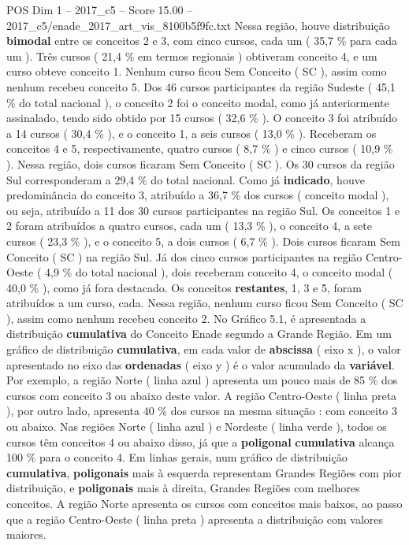 \begin{textsample}{POS Dim 1 – 2017\_c5 – Score 15.00 – 2017\_c5/enade\_2017\_art\_vis\_8100b5f9fc.txt}
Nessa região, houve distribuição \textbf{bimodal} entre os conceitos 2 e 3, com cinco cursos, cada um ( 35,7 \% para cada um ).
Três cursos ( 21,4 \% em termos regionais ) obtiveram conceito 4, e um curso obteve conceito 1.
Nenhum curso ficou Sem Conceito ( SC ), assim como nenhum recebeu conceito 5.
Dos 46 cursos participantes da região Sudeste ( 45,1 \% do total nacional ), o conceito 2 foi o conceito modal, como já anteriormente assinalado, tendo sido obtido por 15 cursos ( 32,6 \% ).
O conceito 3 foi atribuído a 14 cursos ( 30,4 \% ), e o conceito 1, a seis cursos ( 13,0 \% ).
Receberam os conceitos 4 e 5, respectivamente, quatro cursos ( 8,7 \% ) e cinco cursos ( 10,9 \% ).
Nessa região, dois cursos ficaram Sem Conceito ( SC ).
Os 30 cursos da região Sul corresponderam a 29,4 \% do total nacional.
Como já \textbf{indicado}, houve predominância do conceito 3, atribuído a 36,7 \% dos cursos ( conceito modal ), ou seja, atribuído a 11 dos 30 cursos participantes na região Sul.
Os conceitos 1 e 2 foram atribuídos a quatro cursos, cada um ( 13,3 \% ), o conceito 4, a sete cursos ( 23,3 \% ), e o conceito 5, a dois cursos ( 6,7 \% ).
Dois cursos ficaram Sem Conceito ( SC ) na região Sul.
Já dos cinco cursos participantes na região Centro-Oeste ( 4,9 \% do total nacional ), dois receberam conceito 4, o conceito modal ( 40,0 \% ), como já fora destacado.
Os conceitos \textbf{restantes}, 1, 3 e 5, foram atribuídos a um curso, cada.
Nessa região, nenhum curso ficou Sem Conceito ( SC ), assim como nenhum recebeu conceito 2.
No Gráfico 5.1, é apresentada a distribuição \textbf{cumulativa} do Conceito Enade segundo a Grande Região.
Em um gráfico de distribuição \textbf{cumulativa}, em cada valor de \textbf{abscissa} ( eixo x ), o valor apresentado no eixo das \textbf{ordenadas} ( eixo y ) é o valor acumulado da \textbf{variável}.
Por exemplo, a região Norte ( linha azul ) apresenta um pouco mais de 85 \% dos cursos com conceito 3 ou abaixo deste valor.
A região Centro-Oeste ( linha preta ), por outro lado, apresenta 40 \% dos cursos na mesma situação : com conceito 3 ou abaixo.
Nas regiões Norte ( linha azul ) e Nordeste ( linha verde ), todos os cursos têm conceitos 4 ou abaixo disso, já que a \textbf{poligonal} \textbf{cumulativa} alcança 100 \% para o conceito 4.
Em linhas gerais, num gráfico de distribuição \textbf{cumulativa}, \textbf{poligonais} mais à esquerda representam Grandes Regiões com pior distribuição, e \textbf{poligonais} mais à direita, Grandes Regiões com melhores conceitos.
A região Norte apresenta os cursos com conceitos mais baixos, ao passo que a região Centro-Oeste ( linha preta ) apresenta a distribuição com valores maiores.

\end{textsample}
